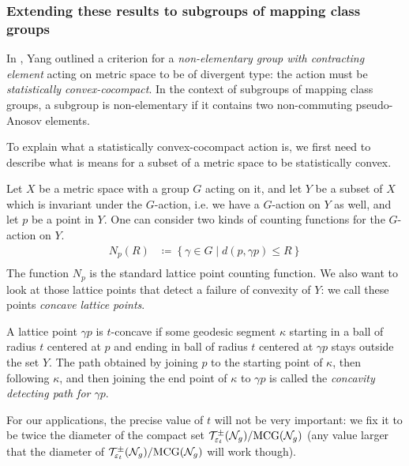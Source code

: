 \subsubsection{Extending these results to subgroups of mapping class groups}
\label{sec:extend-these-results}

In \cite{10.1093/imrn/rny001}, Yang outlined a criterion for a \emph{non-elementary group with contracting element} acting on metric space to be of divergent type: the action must be \emph{statistically convex-cocompact}.
In the context of subgroups of mapping class groups, a subgroup is non-elementary if it contains two non-commuting pseudo-Anosov elements.

To explain what a statistically convex-cocompact action is, we first need to describe what is means for a subset of a metric space to be statistically convex.

Let $X$ be a metric space with a group $G$ acting on it, and let $Y$ be a subset of $X$ which is invariant under the $G$-action, i.e. we have a $G$-action on $Y$ as well, and let $p$ be a point in $Y$.
One can consider two kinds of counting functions for the $G$-action on $Y$.
\begin{align*}
  N_p(R) &\coloneqq \left\{ \gamma \in G \mid d(p, \gamma p) \leq R \right\} \\
\end{align*}
The function $N_p$ is the standard lattice point counting function.
We also want to look at those lattice points that detect a failure of convexity of $Y$: we call these points \emph{concave lattice points}.
\begin{definition}
  A lattice point $\gamma p$ is $t$-concave if some geodesic segment $\kappa$ starting in a ball of radius $t$ centered at $p$ and ending in ball of radius $t$ centered at $\gamma p$ stays outside the set $Y$.
  The path obtained by joining $p$ to the starting point of $\kappa$, then following $\kappa$, and then joining the end point of $\kappa$ to $\gamma p$ is called the \emph{concavity detecting path for $\gamma p$}.
\end{definition}
For our applications, the precise value of $t$ will not be very important: we fix it to be twice the diameter of the compact set $\mathcal{T}_{\varepsilon_t}^{\pm}(\mathcal{N}_g)/\mathrm{MCG}(\mathcal{N}_g)$ (any value larger that the diameter of $\mathcal{T}_{\varepsilon_t}^{\pm}(\mathcal{N}_g)/\mathrm{MCG}(\mathcal{N}_g)$ will work though).

